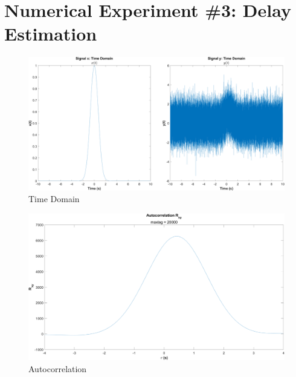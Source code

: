 \documentclass[12pt]{article}
\begin{document}
\section*{Numerical Experiment \#3: Delay Estimation}


\begin{figure}[h]
	\centering
	\includegraphics[width=\textwidth]{exp3_time}
	\caption{\label{fig:exp3_time}Time Domain}
\end{figure}

\begin{figure}[h]
	\centering
	\includegraphics[width=\textwidth]{exp3_autocorr}
	\caption{\label{fig:exp3_autocorr}Autocorrelation}
\end{figure}
\end{document}
